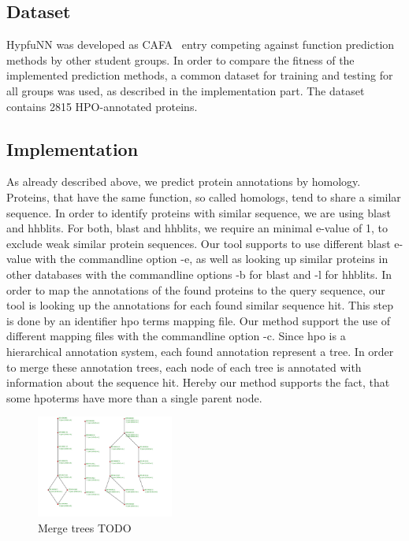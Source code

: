 \subsection{Dataset}

HypfuNN was developed as CAFA~\citep{CAFA} entry competing against function prediction methods by other student groups. In order to compare the fitness of the implemented prediction methods, a common
dataset for training and testing for all groups was used, as described in the implementation part. The dataset contains 2815 HPO-annotated proteins.

\subsection{Implementation}

As already described above, we predict protein annotations by homology. Proteins, that have the same function, so called homologs, tend to share a similar sequence. In order to identify proteins
with similar sequence, we are using blast and hhblits. For both, blast and hhblits, we require an minimal e-value of 1, to exclude weak similar protein sequences. Our tool supports to use
different blast e-value with the commandline option -e, as well as looking up similar proteins in other databases with the commandline options -b for blast and -l for hhblits.\newline
In order to map the annotations of the found proteins to the query sequence, our tool is looking up the annotations for each found similar sequence hit. This step is done by an identifier hpo terms mapping
file. Our method support the use of different mapping files with the commandline option -c.\newline
Since hpo is a hierarchical annotation system, each found annotation represent a tree. In order to merge these annotation trees, each node of each tree is annotated with information about the sequence
hit. Hereby our method supports the fact, that some hpoterms have more than a single parent node.\newline
\begin{figure}[!hb]
\includegraphics[width = 0.4\textwidth]{figures/merge_trees.png}
\caption{Merge trees TODO}
\label{fig:function_transfer}
\end{figure}
